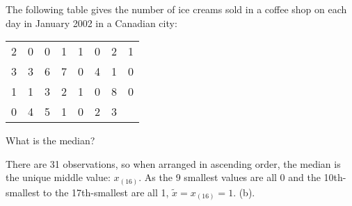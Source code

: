 \documentclass[bigtut]{tutorial}
\begin{document}

\def\var{\textsl{Var}}

\begin{tutorial}%


\begin{questions}

\question
 The following table gives the number of ice creams sold in a coffee shop
    on each day in January 2002 in a Canadian city:
    \begin{center}
                                    \begin{tabular}{llllllll}
                                            2&0&0&1&1&0&2&1\\
                                            3&3&6&7&0&4&1&0\\
                                            1&1&3&2&1&0&8&0\\
                                            0&4&5&1&0&2&3&
                                    \end{tabular}
                            \end{center}
What is the median? 


\begin{solution}
There are 31 observations, so when arranged in ascending order, the median is the unique middle value: $x_{(16)}$. As the 9 smallest values are all 0 and the 10th-smallest to the 17th-smallest are all 1, $\tilde{x} = x_{(16)} = 1$. (b).
\end{solution}


\end{questions}
\end{tutorial}
\end{document}
